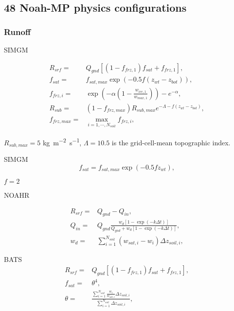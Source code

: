 \documentclass[essd]{copernicus}
\begin{document}
\subsection{48 Noah-MP physics configurations} \label{sec:data:noahmp}

\subsubsection{Runoff}

SIMGM

\begin{align}
    R_{srf} = & Q_{gnd} [(1 - f_{frz,1}) f_{sat} + f_{frz,1} ] \text{,}                                  \\
    f_{sat} = & f_{sat,max} \exp(-0.5 f (z_{wt} - z_{bot})) \text{,}                                \\
    f_{frz,i} = & \exp\left(-\alpha(1 - \frac{w_{ice,1}}{w_{max,1}})\right) - e^{-\alpha} \text{,} \\
    R_{sub} = & (1 - f_{frz,max}) R_{sub,max} e^{-\Lambda - f(z_{wt} - z_{bot})} \text{,} \\
    f_{frz,max} = & \max_{i=1,\cdots,N_{soil}} f_{frz,i} \text{,}
\end{align}

$R_{sub,max} = 5$ \unit{kg~m^{-2}~s^{-1}}, $\Lambda = 10.5$ is the
grid-cell-mean topographic index.


SIMGM
\begin{equation}
    f_{sat} = f_{sat,max} \exp(-0.5 f z_{wt}) \text{,}
\end{equation}

$f=2$

NOAHR

\begin{align}
    R_{srf} = & Q_{gnd} - Q_{in} \text{,} \\
    Q_{in} = & Q_{gnd} \frac{w_d [1-\exp(-k\Delta t)]}{Q_{gnd} + w_d [1 - \exp(-k\Delta t)]} \text{,} \\
    w_d = & \sum_{i=1}^{N_{soil}} (w_{sat,i} - w_i) \Delta z_{soil,i} \text{,}
\end{align}

BATS
\begin{align}
    R_{srf} = & Q_{gnd} \left[ (1 - f_{frz,1}) f_{sat} + f_{frz,1} \right] \text{,} \\
    f_{sat} = & \theta^4 \text{,} \\
    \theta = & \frac{\sum_{i=1}^{N_{soil}}\frac{w_i}{w_{sat,i}}\Delta z_{soil,i}}{\sum_{i=1}^{N_{soil}}\Delta z_{soil,i}} \text{,}
\end{align}
\end{document}
